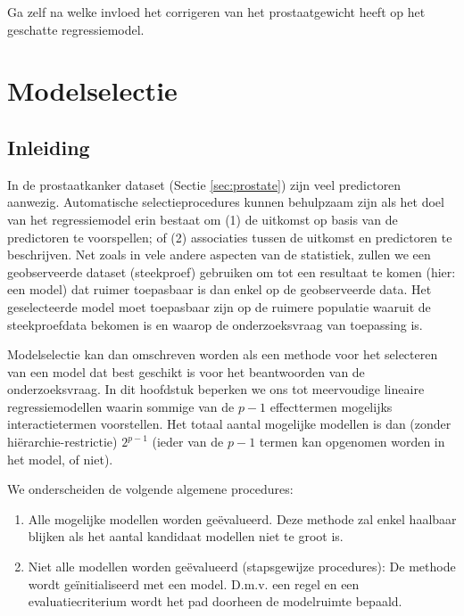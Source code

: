 \documentclass[12pt,dutch,coursenotes]{book}
\theoremstyle{definition}
\theoremstyle{definition}
\theoremstyle{definition}
\theoremstyle{remark}
\begin{document}
Ga zelf na welke invloed het corrigeren van het prostaatgewicht heeft op
het geschatte regressiemodel.

\chapter{Modelselectie}\label{chap:modsel}

\section{Inleiding}\label{inleiding-9}

In de prostaatkanker dataset (Sectie \ref{sec:prostate}) zijn veel
predictoren aanwezig. Automatische selectieprocedures kunnen behulpzaam
zijn als het doel van het regressiemodel erin bestaat om (1) de uitkomst
op basis van de predictoren te voorspellen; of (2) associaties tussen de
uitkomst en predictoren te beschrijven. Net zoals in vele andere
aspecten van de statistiek, zullen we een geobserveerde dataset
(steekproef) gebruiken om tot een resultaat te komen (hier: een model)
dat ruimer toepasbaar is dan enkel op de geobserveerde data. Het
geselecteerde model moet toepasbaar zijn op de ruimere populatie waaruit
de steekproefdata bekomen is en waarop de onderzoeksvraag van toepassing
is.

Modelselectie kan dan omschreven worden als een methode voor het
selecteren van een model dat best geschikt is voor het beantwoorden van
de onderzoeksvraag. In dit hoofdstuk beperken we ons tot meervoudige
lineaire regressiemodellen waarin sommige van de \(p-1\) effecttermen
mogelijks interactietermen voorstellen. Het totaal aantal mogelijke
modellen is dan (zonder hiërarchie-restrictie) \(2^{p-1}\) (ieder van de
\(p-1\) termen kan opgenomen worden in het model, of niet).

We onderscheiden de volgende algemene procedures:

\begin{enumerate}
\def\labelenumi{\arabic{enumi}.}
\item
  Alle mogelijke modellen worden geëvalueerd. Deze methode zal enkel
  haalbaar blijken als het aantal kandidaat modellen niet te groot is.
\item
  Niet alle modellen worden geëvalueerd (stapsgewijze procedures): De
  methode wordt geïnitialiseerd met een model. D.m.v. een regel en een
  evaluatiecriterium wordt het pad doorheen de modelruimte bepaald.
\end{enumerate}
\end{document}
